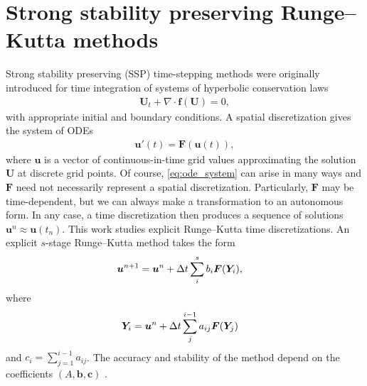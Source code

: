 \section{Strong stability preserving Runge--Kutta methods}\label{sec:SSP}
Strong stability preserving (SSP) time-stepping methods were originally introduced
for time integration of systems of hyperbolic conservation laws
\cite{Shu/Osher:1988} 
\begin{align}\label{eq:pde}
	\bm{U}_t + \nabla \cdot \bm{f}(\bm{U}) = 0,   
\end{align}
with appropriate initial and boundary conditions.
A spatial discretization gives the system of ODEs
\begin{align}\label{eq:ode_system}
    \bm{u}'(t) = \bm{F}(\bm{u}(t)),
\end{align}
where $\bm{u}$ is a vector of continuous-in-time grid values approximating 
the solution $\bm{U}$ at discrete grid points.
Of course, \eqref{eq:ode_system} can arise in many ways and $\bm{F}$
need not necessarily represent a spatial discretization.
Particularly, $\bm{F}$ may be time-dependent, but we can always make a 
transformation to an autonomous form.
In any case, a time discretization then produces a sequence of
solutions $\bm{u}^{n} \approx \bm{u}(t_n)$.
This work studies explicit Runge--Kutta time discretizations.
An explicit $s$-stage Runge--Kutta method takes the form
\begin{align*}
	\bm{u}^{n+1} &= \bm{u}^{n} + \Delta t \sum_i^s b_i \bm{F}(\bm{Y}_i), 
\end{align*}
where
\begin{align*}
	\bm{Y}_i &= \bm{u}^{n} + \Delta t \sum_j^{i-1} a_{ij} \bm{F}(\bm{Y}_j)
\end{align*}
and $c_i = \sum_{j=1}^{i-1}a_{ij}$.
The accuracy and stability of the method depend on the coefficients
$(A,\bm{b},\bm{c})$ \cite{Butcher2008_book}.

